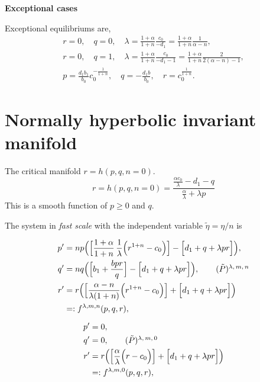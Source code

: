 \documentclass[a4paper,11pt]{article}
\begin{document}
\noindent
{\bf Exceptional cases}
\medskip

Exceptional equilibriums are,
\begin{align*}
 r=0, \quad q=0, \quad \lambda = \frac{1+\alpha}{1+n} \frac{c_0}{-d_1} = \frac{1+\alpha}{1+n} \frac{1}{\alpha-n},\\
 r=0, \quad q=1, \quad \lambda = \frac{1+\alpha}{1+n} \frac{c_0}{-d_1-1}= \frac{1+\alpha}{1+n} \frac{2}{2(\alpha-n)-1},\\
 p = \frac{d_1b_1}{b_0} c_0^{-\frac{1}{1+n}}, \quad q=-\frac{d_1 b}{b_0}, \quad r=c_0^{\frac{1}{1+n}}.
\end{align*}



\section{Normally hyperbolic invariant manifold}
The critical manifold $r=h(p,q,n=0)$.
\begin{equation}
 r=h(p,q,n=0) = \frac{ \frac{\alpha c_0}{\lambda} - d_1 -q }{ \frac{\alpha}{\lambda} + \lambda p}
\end{equation}
This is a smooth function of $p\ge0$ and $q$.

The system in {\it fast scale} with the independent variable $\tilde{\eta} = \eta/n$ is

\begin{align} 
 p^\prime &=np\Big( \Big[\frac{1+\alpha}{1+n}\,\frac{1}{\lambda }\Big(r^{1+n}-c_0\Big)\Big] -\Big[d_1 + q + \lambda pr\Big]\Big), \nonumber \\
 q^\prime &=nq\Big(\Big[b_1 +\frac{bpr}{q}\Big] -\Big[d_1 + q + \lambda pr\Big]\Big), \tag*{($\tilde{P}$)\textsuperscript{$\lambda,m,n$}}\label{eq:pqr_fast} \\%
 r^\prime&=r\Big( \Big[\frac{\alpha-n}{\lambda(1+n)}\Big(r^{1+n}-c_0\Big)\Big]+\Big[d_1 + q + \lambda pr\Big]\Big)\nonumber \\
 &=:f^{\lambda,m,n}(p,q,r), \nonumber
\end{align}

\begin{align} 
 p^\prime &=0, \nonumber \\
 q^\prime &=0, \tag*{($\tilde{P}$)\textsuperscript{$\lambda,m,0$}}\label{eq:pqr_fast} \\%
 r^\prime&=r\Big( \Big[\frac{\alpha}{\lambda}\Big(r-c_0\Big)\Big]+\Big[d_1 + q + \lambda pr\Big]\Big)\nonumber \\
 &=:f^{\lambda,m,0}(p,q,r), \nonumber
\end{align}
\end{document}
